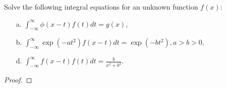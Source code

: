 \begin{problem}{2.9}
  Solve the following integral equations for an unknown function $f(x)$:
  \begin{enumerate}
    \item [a.] $\displaystyle \int_{-\infty}^{\infty} \phi(x-t) f(t) dt = g(x),$
    \item [b.] $\displaystyle \int_{-\infty}^{\infty} \exp(-at^2) f(x-t) dt = \exp(-bt^2) , a > b > 0,$
    \item [d.] $\displaystyle \int_{-\infty}^{\infty} f(x-t) f(t) dt = \frac{b}{x^2 + b^2}.$
  \end{enumerate}
\end{problem}

\begin{proof}
\end{proof}
\newpage
